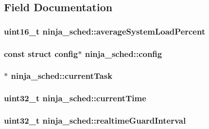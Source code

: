 \subsection{Field Documentation}
\hypertarget{structninja__sched_a06111761deb72df115c42fb91c0a912e}{
\subsubsection[{average\+System\+Load\+Percent}]{\setlength{\rightskip}{0pt plus 5cm}uint16\+\_\+t ninja\+\_\+sched\+::average\+System\+Load\+Percent}}\label{structninja__sched_a06111761deb72df115c42fb91c0a912e}
\hypertarget{structninja__sched_abf477daa3f31be2ba829556bc934ab23}{
\subsubsection[{config}]{\setlength{\rightskip}{0pt plus 5cm}const struct {\bf config}$\ast$ ninja\+\_\+sched\+::config}}\label{structninja__sched_abf477daa3f31be2ba829556bc934ab23}
\hypertarget{structninja__sched_a61503437539b592233656df84e06cf34}{
\subsubsection[{current\+Task}]{$\ast$ ninja\+\_\+sched\+::current\+Task}}\label{structninja__sched_a61503437539b592233656df84e06cf34}
\hypertarget{structninja__sched_ae954a7baf1898a5a15ce32c6cf525a50}{
\subsubsection[{current\+Time}]{\setlength{\rightskip}{0pt plus 5cm}uint32\+\_\+t ninja\+\_\+sched\+::current\+Time}}\label{structninja__sched_ae954a7baf1898a5a15ce32c6cf525a50}
\hypertarget{structninja__sched_a43d3b0bfb4c15319453588f044695c17}{
\subsubsection[{realtime\+Guard\+Interval}]{\setlength{\rightskip}{0pt plus 5cm}uint32\+\_\+t ninja\+\_\+sched\+::realtime\+Guard\+Interval}}\label{structninja__sched_a43d3b0bfb4c15319453588f044695c17}
